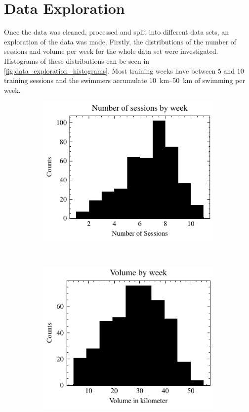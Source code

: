 \section{Data Exploration}
Once the data was cleaned, processed and split into different data sets, an exploration of the data was made. 
Firstly, the distributions of the number of sessions and volume per week for the whole data set were investigated.
Histograms of these distributions can be seen in \cref{fig:data_exploration_histograms}.
Most training weeks have between 5 and 10 training sessions and the swimmers accumulate \SIrange{10}{50}{\kilo\meter} of swimming per week.


\begin{figure}[ht]
    \centering
    \begin{subfigure}[t]{0.48\textwidth}
        \centering
        \includegraphics[width=\textwidth]{chapters/figures/data_exploration/hist_nbr_sessions.pdf}
    \end{subfigure}%
    ~ 
    \begin{subfigure}[t]{0.48\textwidth}
        \centering
        \includegraphics[width=\textwidth]{chapters/figures/data_exploration/hist_volume.pdf}

\end{subfigure}
\end{figure}
